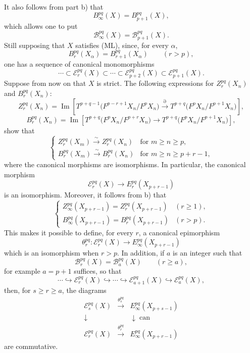 \documentclass[11pt]{article}
\providecommand{\Im}{\operatorname{Im}}
\renewcommand{\Im}{\operatorname{Im}}
\providecommand{\Im}{\operatorname{Im}}
\providecommand{\can}{\operatorname{can}}
\begin{document}
It also follows from part b) that
\[
B_\infty^{pq}(X)=B_{p+1}^{pq}(X),
\]
which allows one to put
\[
\mathcal B_\infty^{pq}(X)=\mathcal B_{p+1}^{pq}(X).
\]
Still supposing that \(X\) satisfies (ML), since, for every \(\alpha\),
\[
B_r^{pq}(X_\alpha)=B_{r+1}^{pq}(X_\alpha)\qquad(r>p),
\]
one has a sequence of canonical monomorphisms
\begin{equation}
\cdots\subset\mathcal E_r^{pq}(X)\subset\cdots\subset\mathcal E_{p+2}^{pq}(X)\subset\mathcal E_{p+1}^{pq}(X).
\tag{S}
\end{equation}
Suppose from now on that \(X\) is strict. The following expressions for \(Z_r^{pq}(X_n)\) and \(B_r^{pq}(X_n)\):
\[
Z_r^{pq}(X_n)=
\Im\!\left[
T^{p+q-1}\bigl(F^{p-r+1}X_n/F^pX_n\bigr)
\xrightarrow{\partial}
T^{p+q}\bigl(F^pX_n/F^{p+1}X_n\bigr)
\right],
\]
\[
B_r^{pq}(X_n)=
\Im\!\left[
T^{p+q}\bigl(F^pX_n/F^{p+r}X_n\bigr)
\longrightarrow
T^{p+q}\bigl(F^pX_n/F^{p+1}X_n\bigr)
\right],
\]
show that
\begin{equation}
\left\{
\begin{array}{ll}
Z_r^{pq}(X_m)\xrightarrow{\sim}Z_r^{pq}(X_n)&\text{for }m\ge n\ge p,\\[3pt]
B_r^{pq}(X_m)\xrightarrow{\sim}B_r^{pq}(X_n)&\text{for }m\ge n\ge p+r-1,
\end{array}
\right.
\tag{\(d_1\)}
\end{equation}
where the canonical morphisms are isomorphisms. In particular, the canonical morphism
\[
\mathcal E_r^{pq}(X)\longrightarrow E_r^{pq}(X_{p+r-1})
\]
is an isomorphism. Moreover, it follows from b) that
\begin{equation}
\left\{
\begin{array}{ll}
Z_\infty^{pq}(X_{p+r-1})=Z_r^{pq}(X_{p+r-1})&(r\ge1),\\[3pt]
B_\infty^{pq}(X_{p+r-1})=B_r^{pq}(X_{p+r-1})&(r>p).
\end{array}
\right.
\tag{\(d_2\)}
\end{equation}
This makes it possible to define, for every \(r\), a canonical epimorphism
\[
\theta_r^{pq}:\mathcal E_r^{pq}(X)\longrightarrow E_\infty^{pq}(X_{p+r-1})
\]
which is an isomorphism when \(r>p\). In addition, if \(a\) is an integer such that
\[
\mathcal B_r^{pq}(X)=\mathcal B_a^{pq}(X)\qquad(r\ge a),
\]
for example \(a=p+1\) suffices, so that
\begin{equation}
\cdots\hookrightarrow\mathcal E_r^{pq}(X)\hookrightarrow\cdots\hookrightarrow
\mathcal E_{a+1}^{pq}(X)\hookrightarrow\mathcal E_a^{pq}(X),
\tag{S bis}
\end{equation}
then, for \(s\ge r\ge a\), the diagrams
\begin{equation}
\begin{array}{ccc}
\mathcal E_s^{pq}(X)&\xrightarrow{\theta_s^{pq}}&E_\infty^{pq}(X_{p+s-1})\\
\downarrow&&\downarrow\can\\
\mathcal E_r^{pq}(X)&\xrightarrow{\theta_r^{pq}}&E_\infty^{pq}(X_{p+r-1})
\end{array}
\tag{\(d_3\)}
\end{equation}
are commutative.
\end{document}
